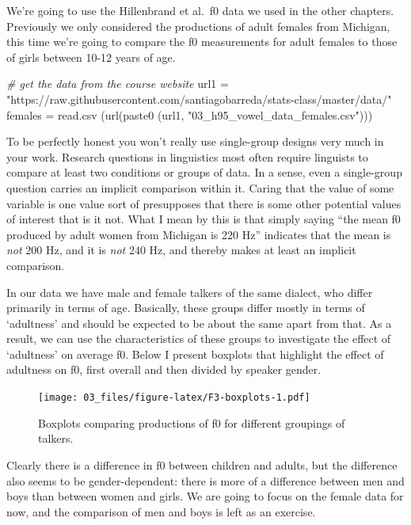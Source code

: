 \documentclass[
]{book}
\newenvironment{Shaded}{\begin{snugshade}}{\end{snugshade}}
\newcommand{\CommentTok}[1]{\textcolor[rgb]{0.56,0.35,0.01}{\textit{#1}}}
\newcommand{\FunctionTok}[1]{\textcolor[rgb]{0.00,0.00,0.00}{#1}}
\newcommand{\NormalTok}[1]{#1}
\newcommand{\OtherTok}[1]{\textcolor[rgb]{0.56,0.35,0.01}{#1}}
\newcommand{\StringTok}[1]{\textcolor[rgb]{0.31,0.60,0.02}{#1}}
\begin{document}
We're going to use the Hillenbrand et al.~f0 data we used in the other chapters. Previously we only considered the productions of adult females from Michigan, this time we're going to compare the f0 measurements for adult females to those of girls between 10-12 years of age.

\begin{Shaded}
\begin{Highlighting}[]
\CommentTok{\# get the data from the course website}
\NormalTok{url1 }\OtherTok{=} \StringTok{"https://raw.githubusercontent.com/santiagobarreda/stats{-}class/master/data/"}
\NormalTok{females }\OtherTok{=} \FunctionTok{read.csv}\NormalTok{ (}\FunctionTok{url}\NormalTok{(}\FunctionTok{paste0}\NormalTok{ (url1, }\StringTok{"03\_h95\_vowel\_data\_females.csv"}\NormalTok{)))}
\end{Highlighting}
\end{Shaded}

To be perfectly honest you won't really use single-group designs very much in your work. Research questions in linguistics most often require linguists to compare at least two conditions or groups of data. In a sense, even a single-group question carries an implicit comparison within it. Caring that the value of some variable is one value sort of presupposes that there is some other potential values of interest that is it not. What I mean by this is that simply saying ``the mean f0 produced by adult women from Michigan is 220 Hz'' indicates that the mean is \emph{not} 200 Hz, and it is \emph{not} 240 Hz, and thereby makes at least an implicit comparison.

In our data we have male and female talkers of the same dialect, who differ primarily in terms of age. Basically, these groups differ mostly in terms of `adultness' and should be expected to be about the same apart from that. As a result, we can use the characteristics of these groups to investigate the effect of `adultness' on average f0. Below I present boxplots that highlight the effect of adultness on f0, first overall and then divided by speaker gender.

\begin{figure}
\centering
\texttt{[image: 03\_files/figure-latex/F3-boxplots-1.pdf]}
\caption{\label{fig:F3-boxplots}Boxplots comparing productions of f0 for different groupings of talkers.}
\end{figure}

Clearly there is a difference in f0 between children and adults, but the difference also seems to be gender-dependent: there is more of a difference between men and boys than between women and girls. We are going to focus on the female data for now, and the comparison of men and boys is left as an exercise.
\end{document}
